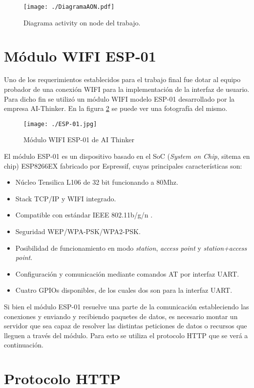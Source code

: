 \begin{figure}[H]
	\centering
	\texttt{[image: ./DiagramaAON.pdf]}
	\caption{Diagrama activity on node del trabajo.}
	\label{fig:AON}
\end{figure}

\section{Módulo WIFI ESP-01}
Uno de los requerimientos establecidos para el trabajo final fue dotar al equipo probador de una conexión WIFI para la implementación de la interfaz de usuario. Para dicho fin se utilizó un módulo WIFI modelo ESP-01 desarrollado por la empresa AI-Thinker. En la figura \ref{fig:ESP01} se puede ver una fotografía del mismo.

\begin{figure}[H]
	\centering
	\texttt{[image: ./ESP-01.jpg]}
	\caption{Módulo WIFI ESP-01 de AI Thinker}
	\label{fig:ESP01}
\end{figure}

El módulo ESP-01 es un dispositivo basado en el SoC (\emph{System on Chip}, sitema en chip) ESP8266EX fabricado por Espressif,
cuyas principales características son:
\begin{itemize}
	\item Núcleo Tensilica L106 de 32 bit funcionando a 80Mhz.
	\item Stack TCP/IP y WIFI integrado.
	\item Compatible con estándar IEEE 802.11b/g/n .
	\item Seguridad WEP/WPA-PSK/WPA2-PSK.
	\item Posibilidad de funcionamiento en modo \emph{station}, \emph{access point} y \emph{station+access point}.
	\item Configuración y comunicación mediante comandos AT por interfaz UART.
	\item Cuatro GPIOs disponibles, de los cuales dos son para la interfaz UART.

\end{itemize}

Si bien el módulo ESP-01 resuelve una parte de la comunicación estableciendo las conexiones y enviando y recibiendo paquetes de datos, es necesario montar un servidor que sea capaz de resolver las distintas peticiones de datos o recursos que lleguen a través del módulo. Para esto se utiliza el protocolo HTTP que se verá a continuación. 

\section{Protocolo HTTP}

